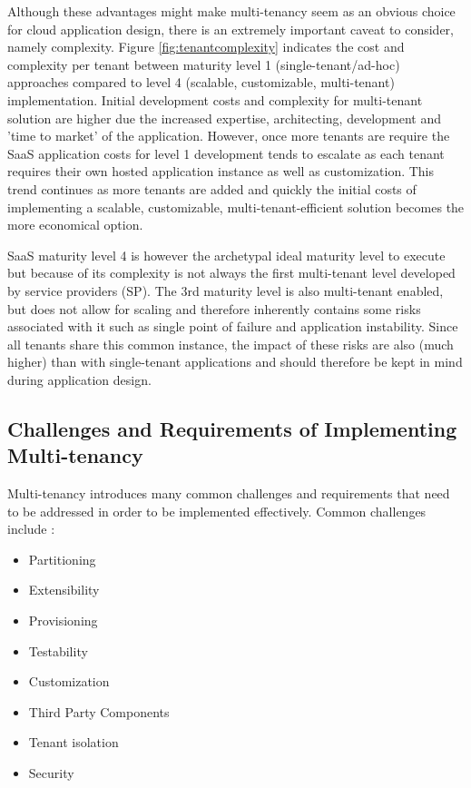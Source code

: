 Although these advantages might make multi-tenancy seem as an obvious choice for cloud application design, there is an extremely important caveat to consider, namely complexity. Figure \ref{fig:tenantcomplexity} indicates the cost and complexity per tenant between maturity level 1 (single-tenant/ad-hoc) approaches compared to level 4 (scalable, customizable, multi-tenant) implementation. Initial development costs and complexity for multi-tenant solution are higher due the increased expertise, architecting, development and 'time to market' of the application. However, once more tenants are require the SaaS application costs for level 1 development tends to escalate as each tenant requires their own hosted application instance as well as customization. This trend continues as more tenants are added and quickly the initial costs of implementing a scalable, customizable, multi-tenant-efficient solution becomes the more economical option.


SaaS maturity level 4 is however the archetypal ideal maturity level to execute but because of its complexity is not always the first multi-tenant level developed by service providers (SP). The 3rd maturity level is also multi-tenant enabled, but does not allow for scaling and therefore inherently contains some risks associated with it such as single point of failure and application instability. Since all tenants share this common instance, the impact of these risks are also (much higher) than with single-tenant applications and should therefore be kept in mind during application design.

\subsection{Challenges and Requirements of Implementing Multi-tenancy}

Multi-tenancy introduces many common challenges and requirements that need to be addressed in order to be implemented effectively. Common challenges include \cite{Betts2012-ad}:

\begin{itemize}
\item Partitioning
\item Extensibility
\item Provisioning
\item Testability
\item Customization
\item Third Party Components
\item Tenant isolation
\item Security
\end{itemize}

